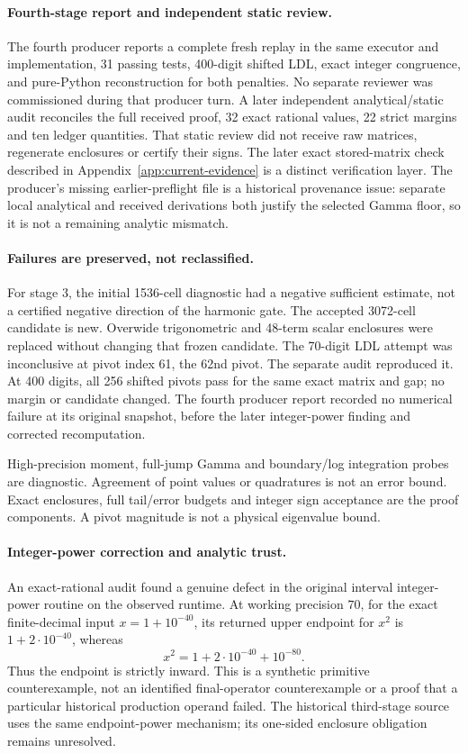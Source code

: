 \documentclass[11pt,a4paper]{article}
\numberwithin{equation}{section}
\theoremstyle{definition}\newtheorem{definition}[theorem]{Definition}
\theoremstyle{remark}\newtheorem{remark}[theorem]{Remark}
\begin{document}
\paragraph{Fourth-stage report and independent static review.}
The fourth producer reports a complete fresh replay in the same executor
and implementation, 31 passing tests, 400-digit shifted LDL, exact integer
congruence, and pure-Python reconstruction for both penalties.
No separate reviewer was commissioned during that producer turn.
A later independent analytical/static audit reconciles the full received
proof, 32 exact rational values, 22 strict margins and ten ledger quantities.
That static review did not receive raw matrices, regenerate enclosures or certify their signs. The later exact stored-matrix check described in Appendix~\ref{app:current-evidence} is a distinct verification layer. The producer's missing earlier-preflight file is a historical
provenance issue: separate local analytical and received derivations both justify
the selected Gamma floor, so it is not a remaining analytic mismatch.

\paragraph{Failures are preserved, not reclassified.}
For stage 3, the initial 1536-cell diagnostic had a negative sufficient
estimate, not a certified negative direction of the harmonic gate.
The accepted 3072-cell candidate is new. Overwide trigonometric and
48-term scalar enclosures were replaced without changing that frozen candidate.
The 70-digit LDL attempt was inconclusive at pivot index 61, the 62nd pivot.
The separate audit reproduced it. At 400 digits, all 256 shifted pivots
pass for the same exact matrix and gap; no margin or candidate changed.
The fourth producer report recorded no numerical failure at its original
snapshot, before the later integer-power finding and corrected recomputation.

High-precision moment, full-jump Gamma and boundary/log integration probes
are diagnostic. Agreement of point values or quadratures is not an error
bound. Exact enclosures, full tail/error budgets and integer sign acceptance
are the proof components. A pivot magnitude is not a physical eigenvalue bound.

\paragraph{Integer-power correction and analytic trust.}\label{vrg:par:arithmetic}
An exact-rational audit found a genuine defect in the original interval
integer-power routine on the observed runtime. At working precision $70$,
for the exact finite-decimal input $x=1+10^{-40}$, its returned upper
endpoint for $x^2$ is $1+2\cdot10^{-40}$, whereas
\[
 x^2=1+2\cdot10^{-40}+10^{-80}.
\]
Thus the endpoint is strictly inward. This is a synthetic primitive
counterexample, not an identified final-operator counterexample or a
proof that a particular historical production operand failed. The
historical third-stage source uses the same endpoint-power mechanism;
its one-sided enclosure obligation remains unresolved.
\end{document}
